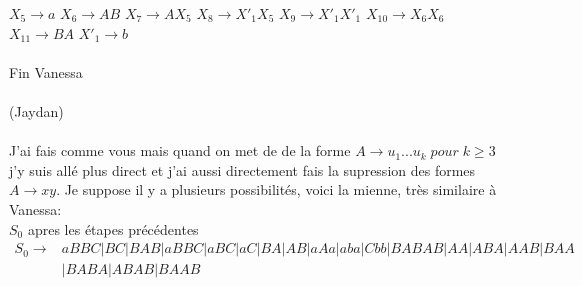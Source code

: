 \documentclass{article}
\begin{document}
\newline $X_5 \rightarrow a$
\newline $X_6 \rightarrow AB$
\newline $X_7 \rightarrow AX_5$
\newline $X_8 \rightarrow X'_1X_5$
\newline $X_9 \rightarrow X'_1X'_1$
\newline $X_{10} \rightarrow X_6X_6$
\newline $X_{11} \rightarrow BA$
\newline $X'_1 \rightarrow b$
\\
\\
{Fin Vanessa}
\\
\\
(Jaydan)
\\
\\
J'ai fais comme vous mais quand on met de de la forme $A \rightarrow u_1...u_k\; pour\; k \geq 3$ j'y suis allé plus direct et j'ai aussi directement fais la supression des formes $A \rightarrow xy$. Je suppose il y a plusieurs possibilités, voici la mienne, très similaire à Vanessa:
\\
\newline $S_0$ apres les étapes précédentes
\begin{align*}
    S_0 \rightarrow &aBBC | BC | BAB |aBBC | aBC | aC | BA | AB | aAa | aba | Cbb | BABAB | AA | ABA | AAB | BAA \\
    &| BABA | ABAB | BAAB\\
\end{align*}
\end{document}
